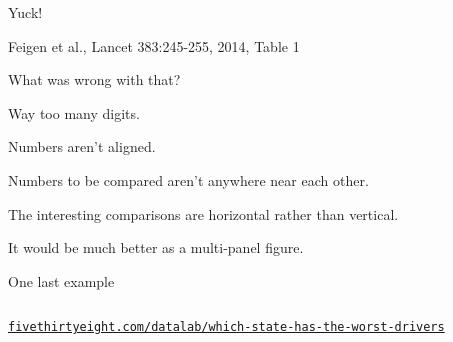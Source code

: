 \documentclass[aspectratio=169,12pt,t]{beamer}
\begin{document}
\begin{frame}[c]{Yuck!}


\vspace{12pt}
\lolit \footnotesize \hfill
Feigen et al., Lancet 383:245-255, 2014, Table 1

\note{
}
\end{frame}

\begin{frame}{What was wrong with that?}

  \bbi
\item {\vhilit Way} too many digits.

\item Numbers aren't aligned.

\item Numbers to be compared aren't anywhere near each other.

\item The interesting comparisons are horizontal rather than
  vertical.

\item It would be much better as a multi-panel figure.
\ei

\note{
}
\end{frame}


\begin{frame}{One last example}

\begin{columns}









\end{columns}

\vspace{12pt}
\hfill \footnotesize \lolit
\href{https://fivethirtyeight.com/datalab/which-state-has-the-worst-drivers/}{\tt fivethirtyeight.com/datalab/which-state-has-the-worst-drivers}

\note{
}
\end{frame}
\end{document}
